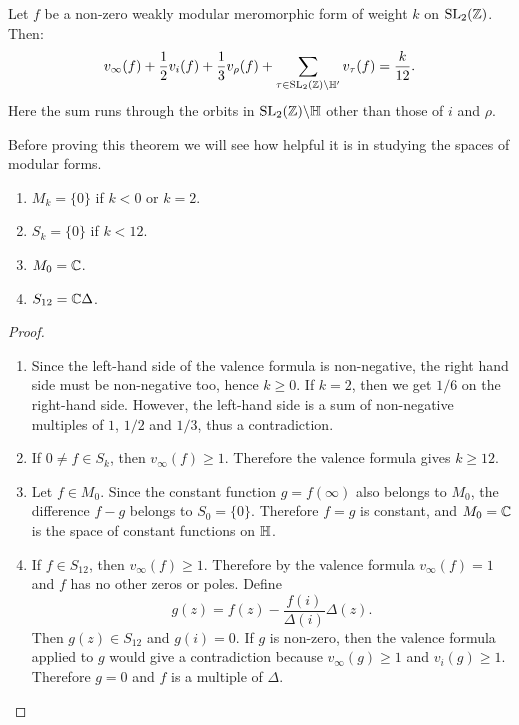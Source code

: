 \begin{theorem}
\label{thm:valence-formula}
  Let $f$ be a non-zero weakly modular meromorphic form of weight $k$ on $\operatorname{SL}_2(\mathbb{Z})$. Then:
\[
v_\infty(f)+\frac 12 v_i(f)+\frac 13 v_\rho(f) + \sum_{\tau\in \operatorname{SL}_2(\mathbb{Z})\backslash\mathbb{H}'} v_\tau(f) = \frac{k}{12}.
\]
Here the sum runs through the orbits in $\operatorname{SL}_2(\mathbb{Z})\backslash\mathbb{H}$ other than those of $i$ and $\rho$.
\end{theorem}

Before proving this theorem we will see how helpful it is in studying the spaces of modular forms.
\begin{theorem}
  \begin{enumerate}
  \item $M_k=\{0\}$ if $k<0$ or $k = 2$.
  \item $S_k=\{0\}$ if $k < 12$.
  \item $M_0=\mathbb{C}$.
  \item $S_{12} = \mathbb{C}\Delta$.
  \end{enumerate}
\end{theorem}
\begin{proof}
  \begin{enumerate}
  \item   Since the left-hand side of the valence formula is non-negative, the right hand side must be non-negative too, hence $k\geq 0$. If $k=2$, then we get $1/6$ on the right-hand side. However, the left-hand side is a sum of non-negative multiples of $1$, $1/2$ and $1/3$, thus a contradiction.
\item   If $0\neq f\in S_k$, then $v_\infty(f)\geq 1$. Therefore the valence formula gives $k\geq 12$.
\item Let $f\in M_0$. Since the constant function $g=f(\infty)$ also belongs to $M_0$, the difference $f-g$ belongs to $S_0=\{0\}$. Therefore $f=g$ is constant, and $M_0=\mathbb{C}$ is the space of constant functions on $\mathbb{H}$.
\item  If $f\in S_{12}$, then $v_\infty(f)\geq 1$. Therefore by the valence formula $v_\infty(f)=1$ and $f$ has no other zeros or poles. Define
\[
g(z)=f(z)-\frac{f(i)}{\Delta(i)}\Delta(z).
\]
Then $g(z)\in S_{12}$ and $g(i)=0$. If $g$ is non-zero, then the valence formula applied to $g$ would give a contradiction because $v_\infty(g)\geq 1$ and $v_i(g)\geq 1$. Therefore $g=0$ and $f$ is a multiple of $\Delta$.
  \end{enumerate}
\end{proof}

